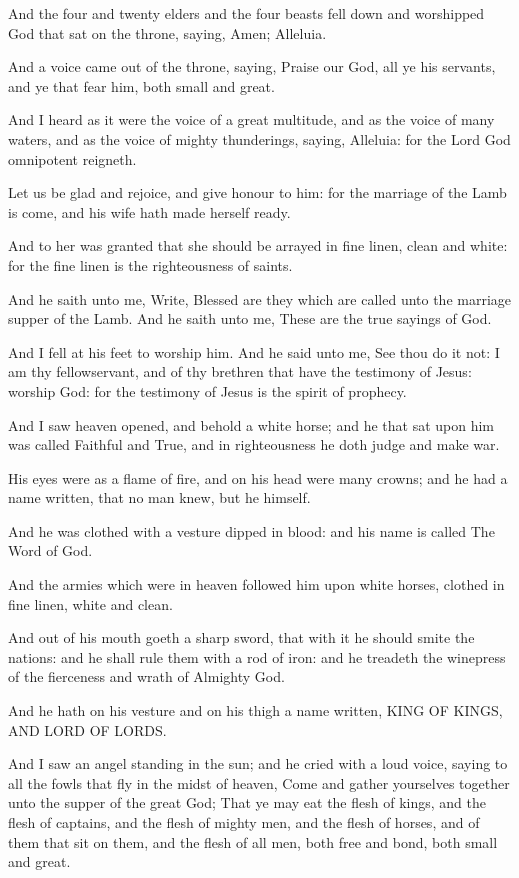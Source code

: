 \Verse And the four and twenty elders and the four beasts fell down and worshipped God that sat on the throne, saying, Amen; Alleluia.

\Verse And a voice came out of the throne, saying, Praise our God, all ye his servants, and ye that fear him, both small and great.

\Verse And I heard as it were the voice of a great multitude, and as the voice of many waters, and as the voice of mighty thunderings, saying, Alleluia: for the Lord God omnipotent reigneth.

\Verse Let us be glad and rejoice, and give honour to him: for the marriage of the Lamb is come, and his wife hath made herself ready.

\Verse And to her was granted that she should be arrayed in fine linen, clean and white: for the fine linen is the righteousness of saints.

\Verse And he saith unto me, Write, Blessed are they which are called unto the marriage supper of the Lamb. And he saith unto me, These are the true sayings of God.

\Verse And I fell at his feet to worship him. And he said unto me, See thou do it not: I am thy fellowservant, and of thy brethren that have the testimony of Jesus: worship God: for the testimony of Jesus is the spirit of prophecy.

\Verse And I saw heaven opened, and behold a white horse; and he that sat upon him was called Faithful and True, and in righteousness he doth judge and make war.

\Verse His eyes were as a flame of fire, and on his head were many crowns; and he had a name written, that no man knew, but he himself.

\Verse And he was clothed with a vesture dipped in blood: and his name is called The Word of God.

\Verse And the armies which were in heaven followed him upon white horses, clothed in fine linen, white and clean.

\Verse And out of his mouth goeth a sharp sword, that with it he should smite the nations: and he shall rule them with a rod of iron: and he treadeth the winepress of the fierceness and wrath of Almighty God.

\Verse And he hath on his vesture and on his thigh a name written, KING OF KINGS, AND LORD OF LORDS.

\Verse And I saw an angel standing in the sun; and he cried with a loud voice, saying to all the fowls that fly in the midst of heaven, Come and gather yourselves together unto the supper of the great God; \Verse That ye may eat the flesh of kings, and the flesh of captains, and the flesh of mighty men, and the flesh of horses, and of them that sit on them, and the flesh of all men, both free and bond, both small and great.

